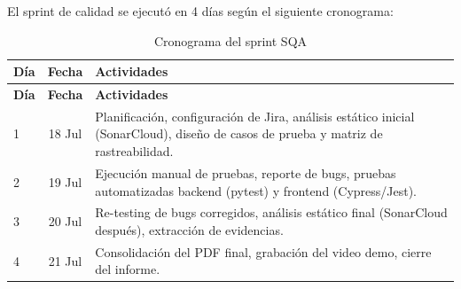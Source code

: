 El sprint de calidad se ejecutó en 4 días según el siguiente cronograma:

\begin{longtable}{lcp{6cm}}
\caption{Cronograma del sprint SQA}
\label{tab:cronograma}\\
\toprule
\textbf{Día} & \textbf{Fecha} & \textbf{Actividades}\\
\midrule
\endfirsthead
\toprule
\textbf{Día} & \textbf{Fecha} & \textbf{Actividades}\\
\midrule
\endhead
\bottomrule
\endfoot

1 & 18 Jul & Planificación, configuración de Jira, análisis estático inicial (SonarCloud), diseño de casos de prueba y matriz de rastreabilidad.\\

2 & 19 Jul & Ejecución manual de pruebas, reporte de bugs, pruebas automatizadas backend (pytest) y frontend (Cypress/Jest).\\

3 & 20 Jul & Re-testing de bugs corregidos, análisis estático final (SonarCloud después), extracción de evidencias.\\

4 & 21 Jul & Consolidación del PDF final, grabación del video demo, cierre del informe.\\

\end{longtable}
